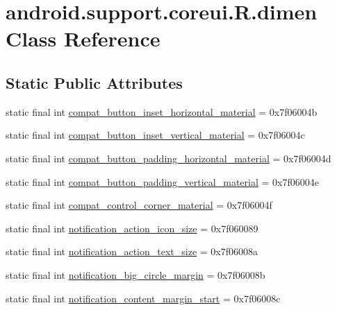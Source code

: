 \hypertarget{classandroid_1_1support_1_1coreui_1_1_r_1_1dimen}{}\section{android.\+support.\+coreui.\+R.\+dimen Class Reference}
\label{classandroid_1_1support_1_1coreui_1_1_r_1_1dimen}
\subsection*{Static Public Attributes}
\begin{DoxyCompactItemize}
\item 
static final int \mbox{\hyperlink{classandroid_1_1support_1_1coreui_1_1_r_1_1dimen_a113d37db2b120347054d243cdab7c406}{compat\+\_\+button\+\_\+inset\+\_\+horizontal\+\_\+material}} = 0x7f06004b
\item 
static final int \mbox{\hyperlink{classandroid_1_1support_1_1coreui_1_1_r_1_1dimen_af920529fa9976907709825f3470fee97}{compat\+\_\+button\+\_\+inset\+\_\+vertical\+\_\+material}} = 0x7f06004c
\item 
static final int \mbox{\hyperlink{classandroid_1_1support_1_1coreui_1_1_r_1_1dimen_a962c0dfd01c24a8867f1c397592dc2bb}{compat\+\_\+button\+\_\+padding\+\_\+horizontal\+\_\+material}} = 0x7f06004d
\item 
static final int \mbox{\hyperlink{classandroid_1_1support_1_1coreui_1_1_r_1_1dimen_a5b37692327bf9749d0958341e0473558}{compat\+\_\+button\+\_\+padding\+\_\+vertical\+\_\+material}} = 0x7f06004e
\item 
static final int \mbox{\hyperlink{classandroid_1_1support_1_1coreui_1_1_r_1_1dimen_a1373681ac36f9ece5be58171b1aa6e6d}{compat\+\_\+control\+\_\+corner\+\_\+material}} = 0x7f06004f
\item 
static final int \mbox{\hyperlink{classandroid_1_1support_1_1coreui_1_1_r_1_1dimen_a67e90fb75a34cba4111616836c9dafc5}{notification\+\_\+action\+\_\+icon\+\_\+size}} = 0x7f060089
\item 
static final int \mbox{\hyperlink{classandroid_1_1support_1_1coreui_1_1_r_1_1dimen_ad9786e898bbe8f9bec84c0fedd60b587}{notification\+\_\+action\+\_\+text\+\_\+size}} = 0x7f06008a
\item 
static final int \mbox{\hyperlink{classandroid_1_1support_1_1coreui_1_1_r_1_1dimen_a8fa1227193763fb32a9dc9a6ea38770f}{notification\+\_\+big\+\_\+circle\+\_\+margin}} = 0x7f06008b
\item 
static final int \mbox{\hyperlink{classandroid_1_1support_1_1coreui_1_1_r_1_1dimen_aaa3551a87d751122fbc6fbf34a19253b}{notification\+\_\+content\+\_\+margin\+\_\+start}} = 0x7f06008c

\end{DoxyCompactItemize}
